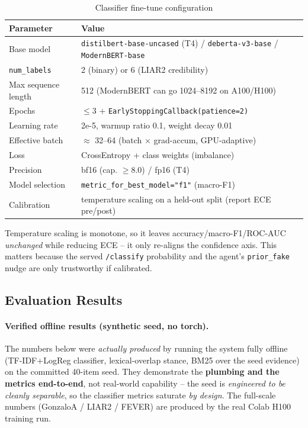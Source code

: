 \documentclass[12pt,a4paper]{article}
\begin{document}
\begin{table}[H]
\centering
\caption{Classifier fine-tune configuration}
\begin{tabular}{ll}
\toprule
\textbf{Parameter} & \textbf{Value} \\
\midrule
Base model & \texttt{distilbert-base-uncased} (T4) / \texttt{deberta-v3-base} / \texttt{ModernBERT-base} \\
\texttt{num\_labels} & 2 (binary) or 6 (LIAR2 credibility) \\
Max sequence length & 512 (ModernBERT can go 1024--8192 on A100/H100) \\
Epochs & $\leq 3$ + \texttt{EarlyStoppingCallback(patience=2)} \\
Learning rate & 2e-5, warmup ratio 0.1, weight decay 0.01 \\
Effective batch & $\approx$ 32--64 (batch $\times$ grad-accum, GPU-adaptive) \\
Loss & CrossEntropy + class weights (imbalance) \\
Precision & bf16 (cap. $\geq 8.0$) / fp16 (T4) \\
Model selection & \texttt{metric\_for\_best\_model="f1"} (macro-F1) \\
Calibration & temperature scaling on a held-out split (report ECE pre/post) \\
\bottomrule
\end{tabular}
\end{table}

\noindent Temperature scaling is monotone, so it leaves accuracy/macro-F1/ROC-AUC \emph{unchanged} while reducing ECE -- it only re-aligns the confidence axis. This matters because the served \texttt{/classify} probability and the agent's \texttt{prior\_fake} nudge are only trustworthy if calibrated.

\subsection{Evaluation Results}

\paragraph{Verified offline results (synthetic seed, no torch).} The numbers below were \emph{actually produced} by running the system fully offline (TF-IDF+LogReg classifier, lexical-overlap stance, BM25 over the seed evidence) on the committed 40-item seed. They demonstrate the \textbf{plumbing and the metrics end-to-end}, not real-world capability -- the seed is \emph{engineered to be cleanly separable}, so the classifier metrics saturate \emph{by design}. The full-scale numbers (GonzaloA / LIAR2 / FEVER) are produced by the real Colab H100 training run.
\end{document}
